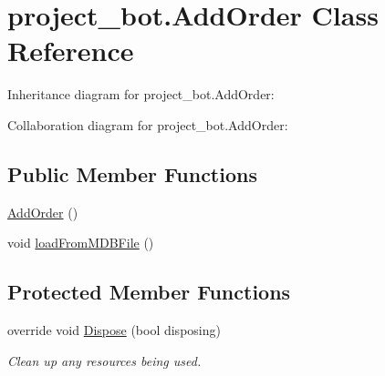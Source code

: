 \hypertarget{classproject__bot_1_1_add_order}{}\section{project\+\_\+bot.\+Add\+Order Class Reference}
\label{classproject__bot_1_1_add_order}


Inheritance diagram for project\+\_\+bot.\+Add\+Order\+:


Collaboration diagram for project\+\_\+bot.\+Add\+Order\+:
\subsection*{Public Member Functions}
\begin{DoxyCompactItemize}
\item 
\hyperlink{classproject__bot_1_1_add_order_a70759d62195c7b92d5680be53ca76937}{Add\+Order} ()
\item 
void \hyperlink{classproject__bot_1_1_add_order_a7a2ef5caf24d7e09afb85ac0632dc71d}{load\+From\+M\+D\+B\+File} ()
\end{DoxyCompactItemize}
\subsection*{Protected Member Functions}
\begin{DoxyCompactItemize}
\item 
override void \hyperlink{classproject__bot_1_1_add_order_acb925db4aacadba96142ee337094705d}{Dispose} (bool disposing)
\begin{DoxyCompactList}\small\item\em Clean up any resources being used. \end{DoxyCompactList}\end{DoxyCompactItemize}

